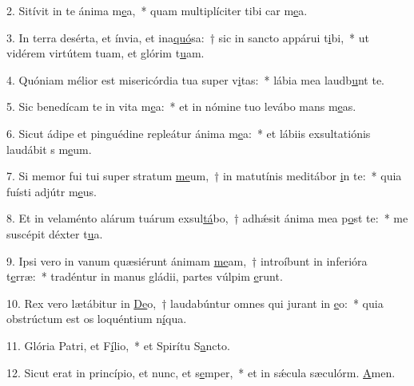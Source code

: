 2. Sitívit in te ánima m\uline{e}a,~* quam multiplíciter tibi car m\uline{e}a.\par 
3. In terra desérta, et ínvia, et ina\uline{quó}sa:~† sic in sancto appárui t\uline{i}bi,~* ut vidérem virtútem tuam, et glórim t\uline{u}am.\par 
4. Quóniam mélior est misericórdia tua super v\uline{i}tas:~* lábia mea laudb\uline{u}nt te.\par 
5. Sic benedícam te in vita m\uline{e}a:~* et in nómine tuo levábo mans m\uline{e}as.\par 
6. Sicut ádipe et pinguédine repleátur ánima m\uline{e}a:~* et lábiis exsultatiónis laudábit s m\uline{e}um.\par 
7. Si memor fui tui super stratum \uline{me}um,~† in matutínis meditábor \uline{i}n te:~* quia fuísti adjútr m\uline{e}us.\par 
8. Et in velaménto alárum tuárum exsul\uline{tá}bo,~† adhǽsit ánima mea p\uline{o}st te:~* me suscépit déxter t\uline{u}a.\par 
9. Ipsi vero in vanum quæsiérunt ánimam \uline{me}am,~† introíbunt in inferióra t\uline{e}rræ:~* tradéntur in manus gládii, partes vúlpim \uline{e}runt.\par 
10. Rex vero lætábitur in \uline{De}o,~† laudabúntur omnes qui jurant in \uline{e}o:~* quia obstrúctum est os loquéntium n\uline{í}qua.\par 
11. Glória Patri, et F\uline{í}lio,~* et Spirítu S\uline{a}ncto.\par 
12. Sicut erat in princípio, et nunc, et s\uline{e}mper,~* et in sǽcula sæculórm. \uline{A}men.\par 
